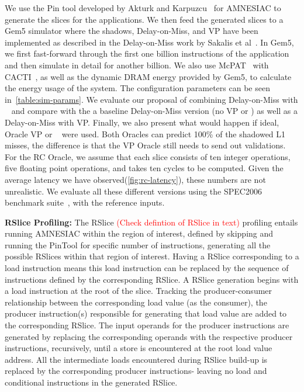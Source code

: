 We use the Pin tool developed by Akturk and Karpuzcu~\cite{} for AMNESIAC to generate the slices for the applications.
We then feed the generated slices to a Gem5 simulator where the shadows, Delay-on-Miss, and VP have been implemented as described in the Delay-on-Miss work by Sakalis et al~\cite{}. In Gem5, we first fast-forward through the first one billion instructions of the application and then simulate in detail for another billion. We also use McPAT~\cite{} with CACTI~\cite{}, as well as the dynamic DRAM energy provided by Gem5, to calculate the energy usage of the system. The configuration parameters can be seen in~\autoref{table:sim-params}.
We evaluate our proposal of combining Delay-on-Miss with \recomp~  and compare with the a baseline Delay-on-Miss version (no VP or \recomp) as well as a Delay-on-Miss with VP. Finally, we also present what would happen if ideal, Oracle VP or \recomp~ were used. Both Oracles can predict 100\% of the shadowed L1 misses, the difference is that the VP Oracle still needs to send out validations. For the RC Oracle, we assume that each slice consists of ten integer operations, five floating point operations, and takes ten cycles to be computed. Given the average latency we have observed(\autoref{fig:rc-latency}), these numbers are not unrealistic.
We evaluate all these different versions using the SPEC2006 benchmark suite~\cite{}, with the reference inputs.

\noindent \textbf{RSlice Profiling:} 
The RSlice \textcolor{red}{(Check defintion of RSlice in text)} profiling entails running AMNESIAC within the region of interest, defined by skipping and running the PinTool for specific number of instructions, generating all the possible RSlices within that region of interest. Having a RSlice corresponding to a load instruction means this load instruction can be replaced by the sequence of instructions defined by the corresponding RSlice. A RSlice generation begins with a load instruction at the root of the slice. Tracking the producer-consumer relationship between the corresponding load value (as the consumer), the producer instruction(s) responsible for generating that load value are added to the corresponding RSlice. The input operands for the producer instructions are generated by replacing the corresponding operands with the respective producer instructions, recursively, until a store is encountered at the root load value address. All the intermediate loads encountered during RSlice build-up is replaced by the corresponding producer instructions- leaving no load and conditional instructions in the generated RSlice.    
